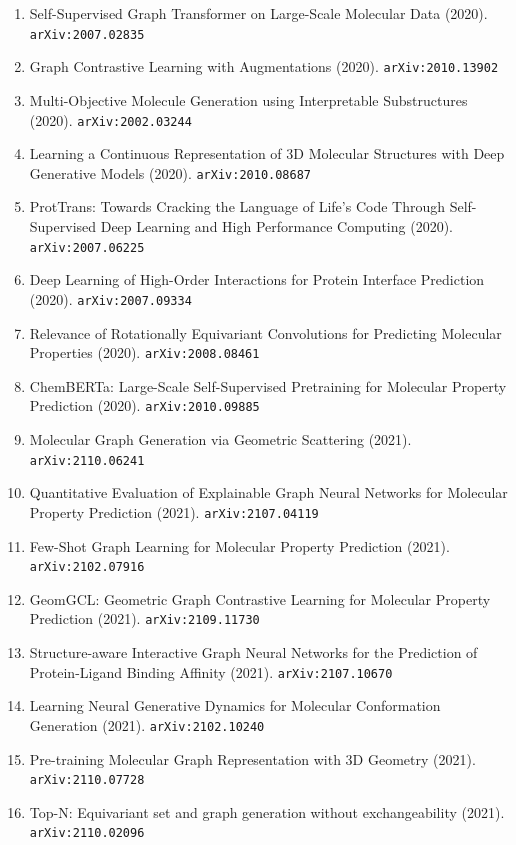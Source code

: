 \documentclass[11pt]{article}
\begin{document}
\begin{enumerate}
  Structures (2020). \texttt{arXiv:2007.06252}
  \item Self-Supervised Graph Transformer on Large-Scale Molecular Data (2020). \texttt{arXiv:2007.02835}
  \item Graph Contrastive Learning with Augmentations (2020). \texttt{arXiv:2010.13902}
  \item Multi-Objective Molecule Generation using Interpretable Substructures (2020). \texttt{arXiv:2002.03244}
  \item Learning a Continuous Representation of 3D Molecular Structures with
  Deep Generative Models (2020). \texttt{arXiv:2010.08687}
  \item ProtTrans: Towards Cracking the Language of Life's Code Through
  Self-Supervised Deep Learning and High Performance Computing (2020). \texttt{arXiv:2007.06225}
  \item Deep Learning of High-Order Interactions for Protein Interface
  Prediction (2020). \texttt{arXiv:2007.09334}
  \item Relevance of Rotationally Equivariant Convolutions for Predicting
  Molecular Properties (2020). \texttt{arXiv:2008.08461}
  \item ChemBERTa: Large-Scale Self-Supervised Pretraining for Molecular
  Property Prediction (2020). \texttt{arXiv:2010.09885}
  \item Molecular Graph Generation via Geometric Scattering (2021). \texttt{arXiv:2110.06241}
  \item Quantitative Evaluation of Explainable Graph Neural Networks for
  Molecular Property Prediction (2021). \texttt{arXiv:2107.04119}
  \item Few-Shot Graph Learning for Molecular Property Prediction (2021). \texttt{arXiv:2102.07916}
  \item GeomGCL: Geometric Graph Contrastive Learning for Molecular Property
  Prediction (2021). \texttt{arXiv:2109.11730}
  \item Structure-aware Interactive Graph Neural Networks for the Prediction of
  Protein-Ligand Binding Affinity (2021). \texttt{arXiv:2107.10670}
  \item Learning Neural Generative Dynamics for Molecular Conformation
  Generation (2021). \texttt{arXiv:2102.10240}
  \item Pre-training Molecular Graph Representation with 3D Geometry (2021). \texttt{arXiv:2110.07728}
  \item Top-N: Equivariant set and graph generation without exchangeability (2021). \texttt{arXiv:2110.02096}

\end{enumerate}
\end{document}
